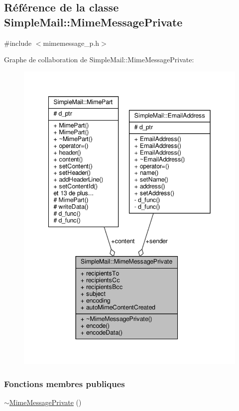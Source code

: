 \hypertarget{class_simple_mail_1_1_mime_message_private}{}\subsection{Référence de la classe Simple\+Mail\+:\+:Mime\+Message\+Private}
\label{class_simple_mail_1_1_mime_message_private}


{\ttfamily \#include $<$mimemessage\+\_\+p.\+h$>$}



Graphe de collaboration de Simple\+Mail\+:\+:Mime\+Message\+Private\+:\nopagebreak
\begin{figure}[H]
\begin{center}
\leavevmode
\includegraphics[width=342pt]{class_simple_mail_1_1_mime_message_private__coll__graph}
\end{center}
\end{figure}
\subsubsection*{Fonctions membres publiques}
\begin{DoxyCompactItemize}
\item 
\hyperlink{class_simple_mail_1_1_mime_message_private_a93ed259a5e3be9645688f2887f5559ed}{$\sim$\+Mime\+Message\+Private} ()
\end{DoxyCompactItemize}
